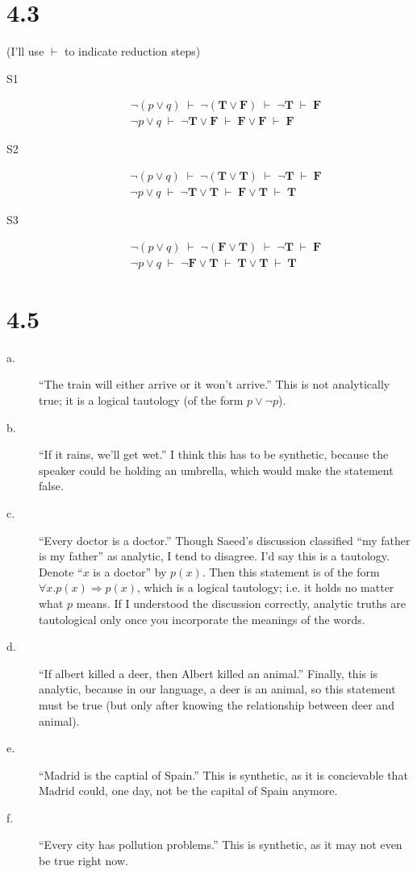 \documentclass[12pt]{article}
\newcommand{\true}{\mathbf{T}}
\newcommand{\false}{\mathbf{F}}
\newcommand{\reduc}{\;\vdash\;}
\begin{document}
\section*{4.3}
(I'll use $\vdash$ to indicate reduction steps)
\begin{description}
\item[S1] 
 \begin{gather*}
   \neg (p \vee q) \reduc \neg (\true \vee \false)
    \reduc \neg \true \reduc \false \\
   \neg p \vee q \reduc \neg \true \vee \false
    \reduc \false \vee \false \reduc \false
 \end{gather*}
\item[S2]
 \begin{gather*}
  \neg (p \vee q) \reduc \neg (\true \vee \true)
   \reduc \neg \true \reduc \false \\
  \neg p \vee q \reduc \neg \true \vee \true
   \reduc \false \vee \true \reduc \true
 \end{gather*}
\item[S3]
 \begin{gather*}
  \neg (p \vee q) \reduc \neg (\false \vee \true)
   \reduc \neg \true \reduc \false \\
  \neg p \vee q \reduc \neg \false \vee \true
   \reduc \true \vee \true \reduc \true
 \end{gather*}
\end{description}

\section*{4.5}
\begin{description}
\item[a.] ``The train will either arrive or it won't arrive.'' This is
not analytically true; it is a logical tautology (of the form $p \vee
\neg p$).
\item[b.] ``If it rains, we'll get wet.''  I think this has to be
synthetic, because the speaker could be holding an umbrella, which would
make the statement false.
\item[c.] ``Every doctor is a doctor.''  Though Saeed's discussion
classified ``my father is my father'' as analytic, I tend to disagree.
I'd say this is a tautology.  Denote ``$x$ is a doctor'' by $p(x)$.
Then this statement is of the form $\forall x. p(x) \Rightarrow p(x)$,
which is a logical tautology; i.e. it holds no matter what $p$ means.
If I understood the discussion correctly, analytic truths are
tautological only once you incorporate the meanings of the words.
\item[d.] ``If albert killed a deer, then Albert killed an animal.''
Finally, this is analytic, because in our language, a deer is an animal,
so this statement must be true (but only after knowing the relationship
between deer and animal).
\item[e.] ``Madrid is the captial of Spain.'' This is synthetic, as it
is concievable that Madrid could, one day, not be the capital of Spain
anymore.
\item[f.] ``Every city has pollution problems.''  This is synthetic, as
it may not even be true right now.
\end{description}
\end{document}

